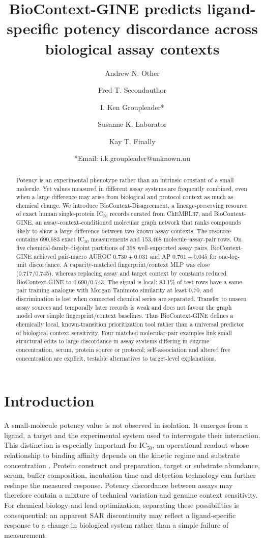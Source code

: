 \documentclass[letterpaper]{article}
\author[1]{Andrew N. Other}
\author[1]{Fred T. Secondauthor}
\author[1]{I. Ken Groupleader*}
\affil[1]{Department of Chemistry, Unknown University, Unknown Town}
\author[2]{Susanne K. Laborator}
\affil[2]{Lead Discovery, BigPharma, Big Town, USA}
\author[1]{Kay T. Finally}
\title{BioContext-GINE predicts ligand-specific potency discordance across biological assay contexts}
\date{*Email: i.k.groupleader@unknown.uu}
\begin{document}
\maketitle


\begin{abstract}
Potency is an experimental phenotype rather than an intrinsic constant of a small molecule. Yet values measured in different assay systems are frequently combined, even when a large difference may arise from biological and protocol context as much as chemical change. We introduce BioContext-Disagreement, a lineage-preserving resource of exact human single-protein IC$_{50}$ records curated from ChEMBL37, and BioContext-GINE, an assay-context-conditioned molecular graph network that ranks compounds likely to show a large difference between two known assay contexts. The resource contains 690,683 exact IC$_{50}$ measurements and 153,468 molecule--assay-pair rows. On five chemical-family-disjoint partitions of 368 well-supported assay pairs, BioContext-GINE achieved pair-macro AUROC $0.730\pm0.031$ and AP $0.761\pm0.045$ for one-log-unit discordance. A capacity-matched fingerprint/context MLP was close (0.717/0.745), whereas replacing assay and target context by constants reduced BioContext-GINE to 0.690/0.743. The signal is local: 83.1\% of test rows have a same-pair training analogue with Morgan Tanimoto similarity at least 0.70, and discrimination is lost when connected chemical series are separated. Transfer to unseen assay sources and temporally later records is weak and does not favour the graph model over simple fingerprint/context baselines. Thus BioContext-GINE defines a chemically local, known-transition prioritization tool rather than a universal predictor of biological context sensitivity. Four matched molecular-pair examples link small structural edits to large discordance in assay systems differing in enzyme concentration, serum, protein source or protocol; self-association and altered free concentration are explicit, testable alternatives to target-level explanations.
\end{abstract}

\section{Introduction}

A small-molecule potency value is not observed in isolation. It emerges from a ligand, a target and the experimental system used to interrogate their interaction. This distinction is especially important for IC$_{50}$, an operational readout whose relationship to binding affinity depends on the kinetic regime and substrate concentration \citep{cheng1973ic50}. Protein construct and preparation, target or substrate abundance, serum, buffer composition, incubation time and detection technology can further reshape the measured response. Potency discordance between assays may therefore contain a mixture of technical variation and genuine context sensitivity. For chemical biology and lead optimization, separating these possibilities is consequential: an apparent SAR discontinuity may reflect a ligand-specific response to a change in biological system rather than a simple failure of measurement.
\end{document}
